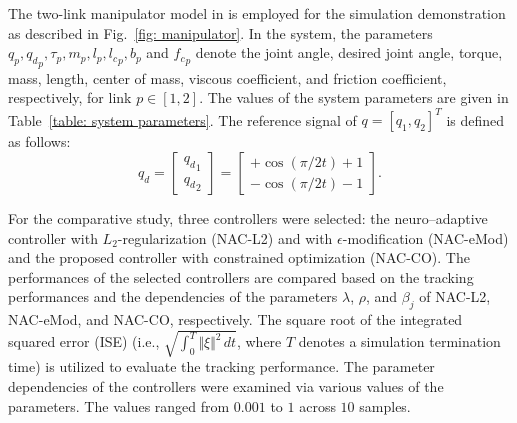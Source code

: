 \documentclass[letterpaper, 10 pt, conference]{ieeeconf}  %
\begin{document}
The two-link manipulator model in \cite{RN33} is employed for the simulation demonstration as described in Fig.~\ref{fig: manipulator}.
In the system, the parameters $q_p,{q_d}_p,\tau_p,m_p,l_p,{l_c}_p,b_p$ and ${f_c}_p$ denote the joint angle, desired joint angle, torque, mass, length, center of mass, viscous coefficient, and friction coefficient, respectively, for link $p\in[1,2]$.
The values of the system parameters are given in Table~\ref{table: system parameters}.
The reference signal of $q=[q_1,q_2]^T$ is defined as follows:
\begin{equation*}
    q_d
    =
    \begin{bmatrix}
        {q_d}_1\\
        {q_d}_2
    \end{bmatrix}
    = 
    \begin{bmatrix}
        +\cos(\pi/2 t) + 1 \\
        -\cos(\pi/2 t) - 1 
    \end{bmatrix}
    .
\end{equation*}

For the comparative study, three controllers were selected: the neuro–adaptive controller with $L_2$-regularization (NAC-L2) and with $\epsilon$-modification (NAC-eMod) and the proposed controller with constrained optimization (NAC-CO).
The performances of the selected controllers are compared based on the tracking performances and the dependencies of the parameters $\lambda$, $\rho$, and $\beta_j$ of NAC-L2, NAC-eMod, and NAC-CO, respectively.
The square root of the integrated squared error (ISE) (i.e., $\sqrt{\int_0^T\Vert\xi\Vert^2\,dt}$, where $T$ denotes a simulation termination time) is utilized to evaluate the tracking performance.
The parameter dependencies of the controllers were examined via various values of the parameters. 
The values ranged from $0.001$ to $1$ across $10$ samples.
\end{document}
